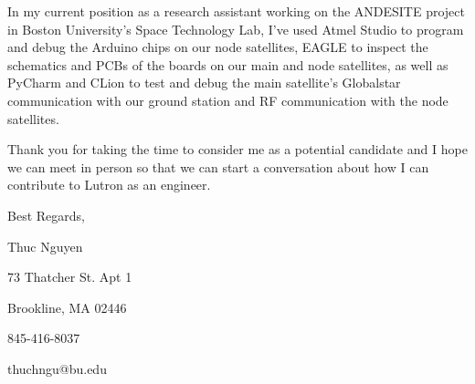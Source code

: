 \documentclass{article}
\begin{document}
\vspace{.6em}
In my current position as a research assistant  working on the ANDESITE project in Boston University's Space Technology Lab, I've used Atmel Studio to program and debug the Arduino chips on our node satellites, EAGLE to inspect the schematics and PCBs of the boards on our main and node satellites, as well as PyCharm and CLion to test and debug the main satellite's Globalstar communication with our ground station and RF communication with the node satellites.

\vspace{.6em}
Thank you for taking the time to consider me as a potential candidate and I hope we can meet in person so that we can start a conversation about how I can contribute to Lutron as an engineer.

\begin{flushleft}
\vspace{1.6em}
Best Regards,

\vspace{1em}

Thuc Nguyen

73 Thatcher St. Apt 1

Brookline, MA 02446

845-416-8037

thuchngu@bu.edu

\end{flushleft}
\end{document}
